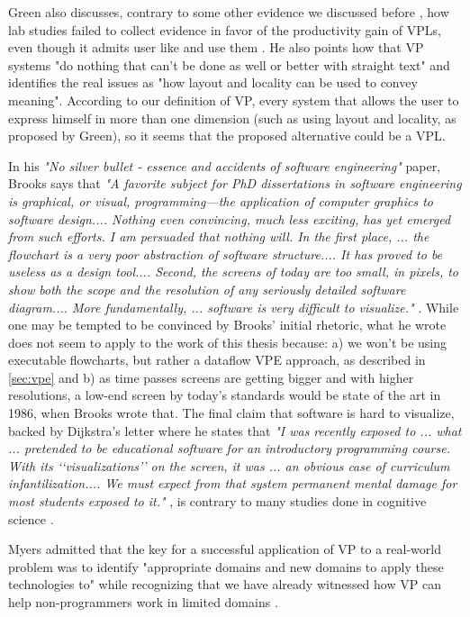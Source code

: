 \begin{itemsize}
Green also discusses, contrary to some other evidence we discussed before \cite{Cardellini2002}\cite{Burnett1999},
how lab studies failed to collect evidence in favor of the productivity gain of
VPLs, even though it admits user like and use them \cite{Shu1988}. He also points
how that VP systems "do nothing that can’t be done as well or better with straight text"
and identifies the real issues as "how layout and locality can be used to convey meaning".
According to our definition of VP, every system that allows the user to express
himself in more than one dimension (such as using layout and locality, as proposed
by Green), so it seems that the proposed alternative could be a VPL.

In his \textit{"No silver bullet - essence and accidents of software engineering"} paper, Brooks
says that \textit{"A favorite subject for PhD dissertations in software engineering is graphical, or visual,
programming—the application of computer graphics to software design....
Nothing even convincing, much less exciting, has yet emerged from such efforts. I am persuaded that nothing will. In
the first place, ... the flowchart is a very poor abstraction of software structure....
It has proved to be useless as a design tool.... Second, the screens of today are too small, in pixels, to show both
the scope and the resolution of any seriously detailed software diagram.... More fundamentally, ...
software is very difficult to visualize."} \cite{Brooks1986}. While one may be tempted
to be convinced by Brooks' initial rhetoric, what he wrote does not seem to apply
to the work of this thesis because: a) we won't be using executable flowcharts,
but rather a dataflow VPE approach, as described in \ref{sec:vpe} and b) as time passes screens
are getting bigger and with higher resolutions, a low-end screen by today's standards
would be state of the art in 1986, when Brooks wrote that. The final claim that
software is hard to visualize, backed by Dijkstra's letter where he states that
\textit{"I was recently exposed to ... what ... pretended to be educational software for an introductory programming course.
With its ‘‘visualizations’’ on the screen, it was ... an obvious case of curriculum
infantilization.... We must expect from that system permanent mental damage for most students
exposed to it."} \cite{dijkstra1989cruelty}, is contrary to many studies done in cognitive science
\cite{Lewis1987}\cite{cunniff1986does}\cite{Carlisle2005}.

Myers admitted that the key for a successful application of VP to a real-world
problem was to identify "appropriate domains and new domains to apply these
technologies to" while recognizing that we have already witnessed how VP can help
non-programmers work in limited domains \cite{Myers1990}.


\end{itemsize}
